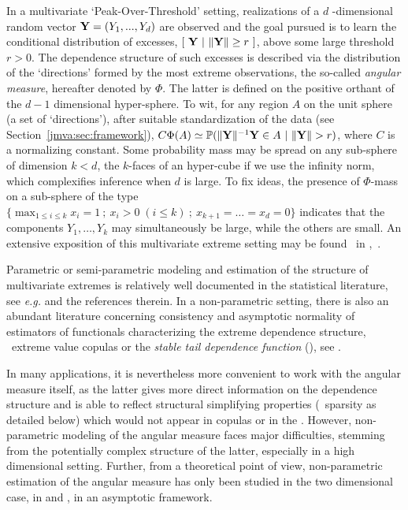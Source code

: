 In a multivariate `Peak-Over-Threshold' setting, realizations of a $d$ -dimensional random vector $\mathbf Y = (Y_1 ,..., Y_d)$ are observed and the goal pursued is to learn the conditional distribution of excesses, $\left[~ \mathbf Y ~|~ \|\mathbf Y\| \ge  r ~ \right]$, above some large threshold $ r>0$.
The dependence structure of such excesses is described via the
distribution of the ‘directions’ formed by the most extreme
observations, the  so-called \emph{angular measure}, hereafter denoted by $\Phi$.  The latter
is defined on the positive orthant of the $d-1$ dimensional
hyper-sphere. To wit, for any region $A$  on the unit sphere (a set
of `directions'), after suitable standardization of the data (see
 Section~\ref{jmva:sec:framework}), 
$C \Phi(A) \simeq \mathbb{P}(\|\mathbf Y\|^{-1} \mathbf Y \in A ~|~ \|\mathbf Y\| >r)$, where $C$ is a normalizing constant. 
Some probability mass may be spread on any sub-sphere of dimension $k
< d$, the $k$-faces of an hyper-cube if we use the infinity norm, which
complexifies inference when $d$ is large. To fix ideas, the presence of $\Phi$-mass on a
sub-sphere of the type $\{\max_{1\leq i\leq k} x_i = 1 ~;~   x_i >0 \;(i\le k) ~;~  x_{k+1} = \ldots = x_d = 0\}$ indicates that the components $Y_1,\ldots,Y_k$ may
simultaneously be large, while the others are small.
An extensive exposition of this multivariate extreme setting may be found \eg~in \cite{Resnick1987},~\cite{BGTS04}. 



Parametric or semi-parametric modeling and estimation of the structure of
multivariate extremes is relatively well documented in the statistical literature, see \emph{e.g.} \cite{coles1991modeling,fougeres2009models,cooley2010pairwise,sabourinNaveau2012} and the references therein. In a non-parametric setting, there is also an abundant literature concerning consistency and asymptotic normality of estimators of functionals characterizing the extreme dependence structure, \eg~extreme value copulas or the \emph{stable tail dependence function} (\stdf), see \cite{Segers12Bernoulli, Drees98, Embrechts2000, Einmahl2012, dHF06}.

In many applications, it is nevertheless more convenient to work with the angular measure itself, as the latter gives more direct information on the dependence structure and is able to reflect structural simplifying properties (\eg~sparsity as detailed below) which would not appear in copulas or in the \stdf.
However, non-parametric modeling of the angular measure faces major difficulties, stemming from the potentially complex structure of the latter, especially in a high dimensional setting.
Further, from a theoretical point of view, non-parametric estimation of the angular measure has only been studied in the two dimensional case, in \cite{Einmahl2001} and \cite{Einmahl2009}, in an asymptotic framework.

